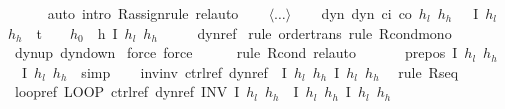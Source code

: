 \documentclass[envcountsame,envcountsect]{llncs}
\begin{document}
\begin{example}
\begin{isabellebody}
\ \ \ \ \isamarkupfalse%
\ {\isacharparenleft}auto\ intro{\isacharbang}{\isacharcolon}\ R{\isacharunderscore}assign{\isacharunderscore}rule{\isacharcomma}\ rel{\isacharunderscore}auto{\isacharprime}{\isacharparenright}\isanewline
\ \ %
\ $\langle\dots\rangle$\isanewline
\ \ \isamarkupfalse%
\ dyn{\isacharcolon}\ {\isachardoublequoteopen}dyn\ c\isactrlsub i\ c\isactrlsub o\ $h_l$\ $h_h$\ {\isasymtau}\ {\isasymle}\ \isactrlbold {\isacharbrackleft}I\ $h_l$\ $h_h$\ {\isasymand}\ t\ {\isacharequal}\ {}\ {\isasymand}\ $h_0$\ {\isacharequal}\ h{\isacharcomma}\ I\ $h_l$\ $h_h$\isactrlbold {\isacharbrackright}{\isachardoublequoteclose}\isanewline 
\ \ {\isacharparenleft}\ {\isachardoublequoteopen}{\isacharunderscore}\ {\isasymle}\ {\isacharquery}dyn{\isacharunderscore}ref{\isachardoublequoteclose}{\isacharparenright}\ \isamarkupfalse%
{\isacharparenleft}rule\ order{\isacharunderscore}trans{\isacharcomma}\ rule\ R{\isacharunderscore}cond{\isacharunderscore}mono{\isacharparenright}\isanewline
\ \ \ \ \isamarkupfalse%
\ dynup\ dyndown\ \isamarkupfalse%
{\isacharparenleft}force{\isacharcomma}\ force{\isacharparenright}\isanewline
\ \ \ \ \isamarkupfalse%
\ {\isacharparenleft}rule\ R{\isacharunderscore}cond{\isacharcomma}\ rel{\isacharunderscore}auto{\isacharprime}{\isacharparenright}\isanewline
\ \ %
\isanewline
\ \ \isamarkupfalse%
\ pre{\isacharunderscore}pos{\isacharcolon}\ {\isachardoublequoteopen}{\isasymlceil}I\ $h_l$\ $h_h${\isasymrceil}\ {\isasymle}\ {\isasymlceil}I\ $h_l$\ $h_h${\isasymrceil}{\isachardoublequoteclose}\ \isamarkupfalse\ simp\isanewline
\ \ \isamarkupfalse%
\ inv{\isacharunderscore}inv{\isacharcolon}\ {\isachardoublequoteopen}{\isacharquery}ctrl{\isacharunderscore}ref{\isacharsemicolon}\ {\isacharquery}dyn{\isacharunderscore}ref\ {\isasymle}\ \isactrlbold {\isacharbrackleft}I\ $h_l$\ $h_h${\isacharcomma}\ I\ $h_l$\ $h_h$\isactrlbold {\isacharbrackright}{\isachardoublequoteclose}\ \isamarkupfalse%
\ {\isacharparenleft}rule\ R{\isacharunderscore}seq{\isacharparenright}\isanewline
\ \ \isamarkupfalse%
\ loopref{\isacharcolon}\ {\isachardoublequoteopen}LOOP\ {\isacharquery}ctrl{\isacharunderscore}ref{\isacharsemicolon}\ {\isacharquery}dyn{\isacharunderscore}ref\ INV\ I\ $h_l$\ $h_h$\ {\isasymle}\ \isactrlbold {\isacharbrackleft}I\ $h_l$\ $h_h${\isacharcomma}\ I\ $h_l$\ $h_h$\isactrlbold {\isacharbrackright}{\isachardoublequoteclose}\isanewline

\end{isabellebody}
\end{example}
\end{document}
